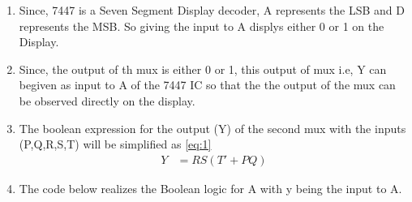 \documentclass{article}
\begin{document}
\begin{enumerate}
\begin{enumerate}
\begin{karnaugh-map}[4][4][2][$T$][$S$][$R$][$Q$][$P$]
				\end{karnaugh-map}
		\newline\item Since, 7447 is a Seven Segment Display decoder, A represents the LSB and D represents the MSB. So giving the input to A displys either 0 or 1 on the Display.
			\item Since, the output of th mux is either 0 or 1, this output of mux i.e, Y can begiven as input to A of the 7447 IC so that the the output of the mux can be observed directly on the display.
			\item The boolean expression for the output (Y) of the second mux with the inputs (P,Q,R,S,T) will be simplified as \ref{eq:1}
				\begin{align}
					{Y} &= {RS(T'+PQ)}
					\label{eq:1}
				\end{align}
				\item The code below realizes the Boolean logic for A with y being the input to A.
					\newline {}
\end{enumerate}
\end{enumerate}
\end{document}
